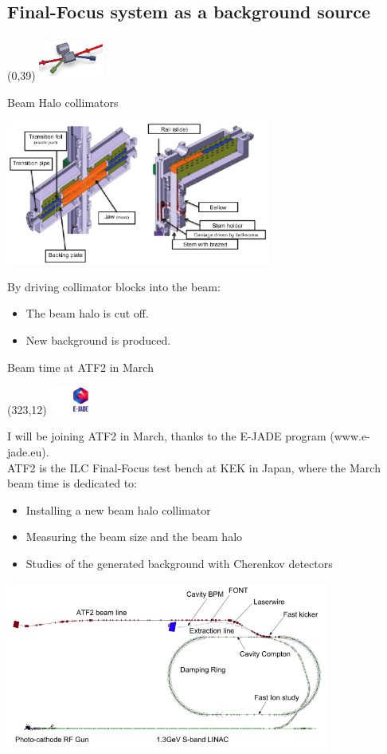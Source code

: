 \documentclass[xcolor={dvipsnames}]{beamer}
\newcommand{\ejadelogo}{
  \setlength{\TPHorizModule}{1pt}
  \setlength{\TPVertModule}{1pt}
  \begin{textblock}{1}(323,12)
   \includegraphics[width=40pt,height=26pt]{figures/EJADE.jpeg}
  \end{textblock}
}
\newcommand{\BDSsymbol}{
  \setlength{\TPHorizModule}{1pt}
  \setlength{\TPVertModule}{1pt}
  \begin{textblock}{1}(0,39)
   \includegraphics[width=60pt,height=40pt]{figures/Highlight_BDS.png}
  \end{textblock}
}
\begin{document}
\subsection{Final-Focus system as a background source}
\BDSsymbol
\begin{frame}{Beam Halo collimators}
 \begin{center}
\includegraphics[width=0.65\textwidth]{figures/ATF2_beamhalo_collimator.pdf}
\end{center}
By driving collimator blocks into the beam:\\
\begin{itemize}
 \item The beam halo is cut off.
 \item New background is produced.
\end{itemize}

\end{frame}

\begin{frame}{Beam time at ATF2 in March}
\ejadelogo
I will be joining ATF2 in March, thanks to the E-JADE program {\tiny(www.e-jade.eu)}.\\
\vspace*{0.3cm}
ATF2 is the ILC Final-Focus test bench at KEK in Japan, where the March beam time is dedicated to:
\begin{itemize}
\item Installing a new beam halo collimator
\item Measuring the beam size and the beam halo
\item Studies of the generated background with Cherenkov detectors
\end{itemize}
\begin{center}
 	\includegraphics[width=0.8\textwidth]{figures/ATF.jpg}
\end{center}

\end{frame}
\end{document}
